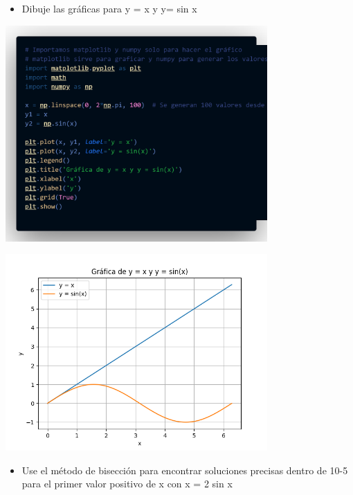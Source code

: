 \documentclass[12pt]{article}
\begin{document}
\vspace{0.5cm}

\begin{itemize}
\item {Dibuje las gráficas para y = x y y= sin x}
\end{itemize}

\begin{minipage}{0.75\textwidth}
    \raggedleft
    \includegraphics[width=0.75\textwidth]{inFiles/Figures/cd2.png}
\end{minipage}

\vspace{0.5cm}

\begin{minipage}{0.75\textwidth}
    \raggedleft
    \includegraphics[width=0.75\textwidth]{inFiles/Figures/Graf_1.png}
\end{minipage}

\vspace{0.5cm}

\begin{itemize}
    \item {Use el método de bisección para encontrar soluciones precisas dentro de 10-5 para el primer valor positivo
    de x con x = 2 sin x}
    \end{itemize}
\end{document}
